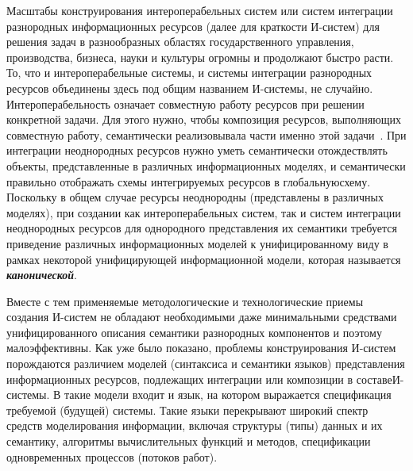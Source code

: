 \begin{multicols}{2}
Масштабы конструирования интероперабельных систем или систем
интеграции разнородных информационных ресурсов (далее для краткости\linebreak
И-систем) для решения задач в разнообразных областях государственного
управления, производства, бизнеса, науки и культуры огромны и
продолжают быстро расти. То, что и интероперабельные системы, и системы
интеграции разнородных ресурсов объединены здесь под общим названием И-системы,
не случайно. Интероперабельность означает совместную
работу ресурсов при решении конкретной задачи. Для этого нужно, чтобы
композиция ресурсов, выполняющих совместную работу, семантически
реализовывала части именно этой задачи~\cite{Ka05}. При интеграции неоднородных
ресурсов нужно уметь семантически отождествлять объекты,
представленные в различных информационных моделях, и семантически
правильно отображать схемы интегрируемых ресурсов в глобальную\linebreak схему.
Поскольку в общем случае ресурсы неоднородны (представлены в различных
моделях), при создании как интероперабельных систем, так и сис\-тем
интеграции неоднородных ресурсов для однородного представления их
семантики требуется приведение различных информационных моделей к
унифицированному виду в рамках некоторой уни\-фи\-ци\-ру\-ющей информационной
модели, которая называется {\bfseries\textit{канонической}}.

Вместе с тем применяемые методологические и технологические приемы
создания И-систем не обладают необходимыми даже минимальными
средствами унифицированного описания семантики разнородных компонентов
и поэтому малоэффективны. Как уже было показано, проблемы\linebreak
конструирования И-систем порождаются различием моделей (синтаксиса и
семантики языков) пред\-став\-ле\-ния информационных ресурсов, подлежащих
интеграции или композиции в составе\linebreak И-сис\-те\-мы. В такие модели
входит и язык, на котором выражается спецификация требуемой
(будущей)  системы. Такие языки перекрывают широкий спектр средств
моделирования информации, включая структуры (типы) данных и их
семантику, алгоритмы вычислительных функций и методов, спецификации
одновременных процессов (потоков работ). 


\end{multicols}
